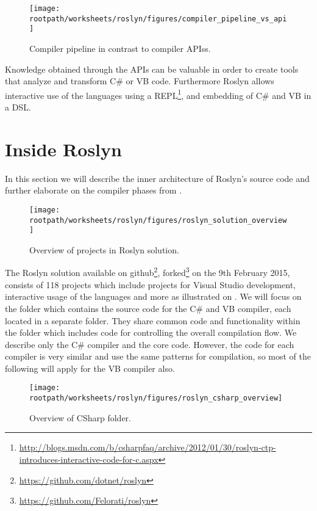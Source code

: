 \begin{figure}[htbp]
\centering
 \texttt{[image: \\rootpath/worksheets/roslyn/figures/compiler\_pipeline\_vs\_api]} 
 \caption{Compiler pipeline in contrast to compiler \acp{API}s\cite[p. 4]{ng2012roslyn}.}
\label{fig:api_vs_compiler_pipeline}
\end{figure}

Knowledge obtained through the \acp{API} can be valuable in order to create tools that analyze and transform C\# or \ac{VB} code. Furthermore Roslyn allows interactive use of the languages using a \acs{REPL}\footnote{\url{http://blogs.msdn.com/b/csharpfaq/archive/2012/01/30/roslyn-ctp-introduces-interactive-code-for-c.aspx}}, and embedding of  C\# and \ac{VB} in a \ac{DSL}\cite[p. 3]{ng2012roslyn}.

\section{Inside Roslyn}
In this section we will describe the inner architecture of Roslyn's source code and further elaborate on the compiler phases from .

\begin{figure}[htbp]
\centering
 \texttt{[image: \\rootpath/worksheets/roslyn/figures/roslyn\_solution\_overview]} 
 \caption{Overview of projects in Roslyn solution.}
\label{fig:roslyn_solution_overview}
\end{figure}

The Roslyn solution available on github\footnote{\url{https://github.com/dotnet/roslyn}}, forked\footnote{\url{https://github.com/Felorati/roslyn}} on the 9th February 2015, consists of 118 projects which include projects for Visual Studio development, interactive usage of the languages and more as illustrated on . We will focus on the  folder which contains the source code for the C\# and \ac{VB} compiler, each located in a separate folder. They share common code and functionality within the  folder which includes code for controlling the overall compilation flow. We describe only the C\# compiler and the core code. However, the code for each compiler is very similar and use the same patterns for compilation\cite[09:36-10:36]{campbellDeeperRos}, so most of the following will apply for the \ac{VB} compiler also.

\begin{figure}[htbp]
\centering
 \texttt{[image: \\rootpath/worksheets/roslyn/figures/roslyn\_csharp\_overview]} 
 \caption{Overview of CSharp folder.}
\label{fig:roslyn_csharp_overview}
\end{figure}

